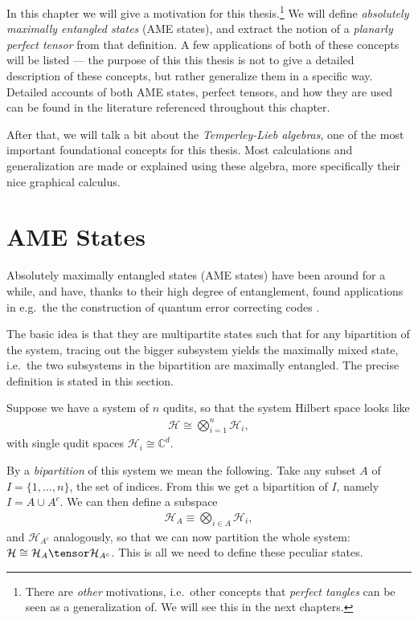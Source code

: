 In this chapter we will give a motivation for this thesis.\footnote{There are \emph{other} motivations, i.e.\ other concepts that \emph{perfect tangles} can be seen as a generalization of. We will see this in the next chapters.} We will define \emph{absolutely maximally entangled states} (AME states), and extract the notion of a \emph{planarly perfect tensor} from that definition. A few applications of both of these concepts will be listed --- the purpose of this this thesis is not to give a detailed description of these concepts, but rather generalize them in a specific way. Detailed accounts of both AME states, perfect tensors, and how they are used can be found in the literature referenced throughout this chapter.

After that, we will talk a bit about the \emph{Temperley-Lieb algebras}, one of the most important foundational concepts for this thesis. Most calculations and generalization are made or explained using these algebra, more specifically their nice graphical calculus.

\section{AME States}
Absolutely maximally entangled states (AME states) have been around for a while, and have, thanks to their high degree of entanglement, found applications in e.g.\ the the construction of quantum error correcting codes \cite{raissi2017constructingQECC}. 

The basic idea is that they are multipartite states such that for any bipartition of the system, tracing out the bigger subsystem yields the maximally mixed state, i.e.\ the two subsystems in the bipartition are maximally entangled. The precise definition is stated in this section.

\bigno Suppose we have a system of $n$ qudits, so that the system Hilbert space looks like 
\begin{align*}
\mathcal{H}\cong \bigotimes_{i=1}^n \mathcal{H}_i,
\end{align*}
with single qudit spaces $\mathcal{H}_i\cong \mathbb{C}^d$. 

By a \emph{bipartition} of this system we mean the following. Take any subset $A$ of $I=\{1, \ldots, n\}$, the set of indices. From this we get a bipartition of $I$, namely $I=A\cup A^c$. We can then define a subspace 
\begin{align*}
\mathcal{H}_A\equiv\bigotimes_{i\in A}\mathcal{H}_i,
\end{align*}
and $\mathcal{H}_{A^c}$ analogously, so that we can now partition the whole system: $\mathcal{H}\cong \mathcal{H}_{A}\tensor\mathcal{H}_{A^c}$. This is all we need to define these peculiar states.

